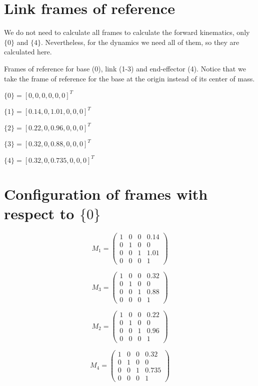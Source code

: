 \documentclass[]{scrreprt}
\begin{document}
\section{Link frames of reference}

We do not need to calculate all frames to calculate the forward kinematics, only $\{0\}$ and $\{4\}$. Nevertheless, for the dynamics we need all of them, so they are calculated here.

Frames of reference for base (0), link (1-3) and end-effector (4). Notice that we take the frame of reference for the base at the origin instead of its center of mass.

$\{0\} = [0, 0, 0, 0, 0, 0]^T$

$\{1\} = [0.14, 0, 1.01, 0, 0, 0]^T$

$\{2\} = [0.22, 0, 0.96, 0, 0, 0]^T$

$\{3\} = [0.32, 0, 0.88, 0, 0, 0]^T$

$\{4\} = [0.32, 0, 0.735, 0, 0, 0]^T$


\section{Configuration of frames with respect to $\{0\}$}


\begin{minipage}{0.5\textwidth}
	\[
	M_1 = \left(\begin{array}{cccc}
	1 & 0 & 0 & 0.14\\
	0 & 1 & 0 & 0\\
	0 & 0 & 1 & 1.01\\
	0 & 0 & 0 & 1
	\end{array}\right)
	\]
	
	\[
	M_3 = \left(\begin{array}{cccc}
	1 & 0 & 0 & 0.32\\
	0 & 1 & 0 & 0\\
	0 & 0 & 1 & 0.88\\
	0 & 0 & 0 & 1
	\end{array}\right)
	\]
\end{minipage}
\begin{minipage}{0.5\textwidth}
	\[
	M_2 = \left(\begin{array}{cccc}
	1 & 0 & 0 & 0.22\\
	0 & 1 & 0 & 0\\
	0 & 0 & 1 & 0.96\\
	0 & 0 & 0 & 1
	\end{array}\right)
	\]
	
	\[
	M_4 = \left(\begin{array}{cccc}
	1 & 0 & 0 & 0.32\\
	0 & 1 & 0 & 0\\
	0 & 0 & 1 & 0.735\\
	0 & 0 & 0 & 1
	\end{array}\right)
	\]
\end{minipage}
\end{document}
